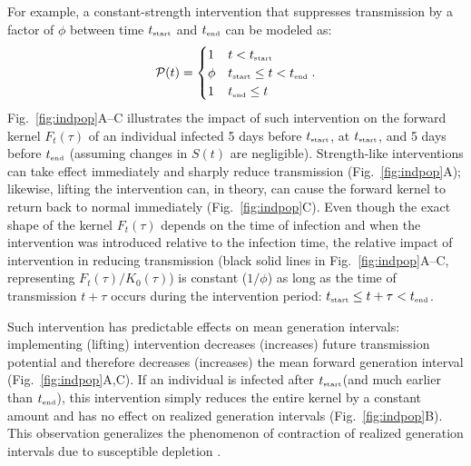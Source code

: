 \documentclass[12pt]{article}
\newcommand{\fref}[1]{Fig.~\ref{fig:#1}}
\newcommand{\tsub}[2]{#1_{{\textrm{\tiny #2}}}}
\newcommand{\tstart}{\ensuremath{\tsub{t}{start}}\xspace}
\newcommand{\tend}{\ensuremath{\tsub{t}{end}}\xspace}
\newcommand{\PP}{{\mathcal P}}
\begin{document}
For example, a constant-strength intervention that suppresses transmission by a factor of $\phi$ between time \tstart and \tend can be modeled as:
\begin{equation}
\PP(t) = \begin{cases}
1 & t < \tstart\\
\phi & \tstart \leq t < \tend\\
1 & \tend \leq t
\end{cases}.
\end{equation}
\fref{indpop}A--C illustrates the impact of such intervention on the forward kernel $F_t(\tau)$ of an individual infected 5 days before $\tstart$, at $\tstart$, and 5 days before $\tend$ (assuming changes in $S(t)$ are negligible).
Strength-like interventions can take effect immediately and sharply reduce transmission (\fref{indpop}A);
likewise, lifting the intervention can, in theory, can cause the forward kernel to return back to normal immediately (\fref{indpop}C).
Even though the exact shape of the kernel $F_t(\tau)$ depends on the time of infection and when the intervention was introduced relative to the infection time, the relative impact of intervention in reducing transmission (black solid lines in \fref{indpop}A--C, representing $F_t(\tau)/K_0(\tau)$) is constant ($1/\phi$) as long as the time of transmission $t+\tau$ occurs during the intervention period: $\tstart \leq t+\tau < \tend$.

Such intervention has predictable effects on mean generation intervals:
implementing (lifting) intervention decreases (increases) future transmission potential and therefore decreases (increases) the mean forward generation interval (\fref{indpop}A,C).
If an individual is infected after \tstart (and much earlier than \tend), this intervention simply reduces the entire kernel by a constant amount and has no effect on realized generation intervals (\fref{indpop}B).
This observation generalizes the phenomenon of contraction of realized generation intervals due to susceptible depletion \citep{kenah2008generation,nishiura2010time,champredon2015intrinsic}.
\end{document}
